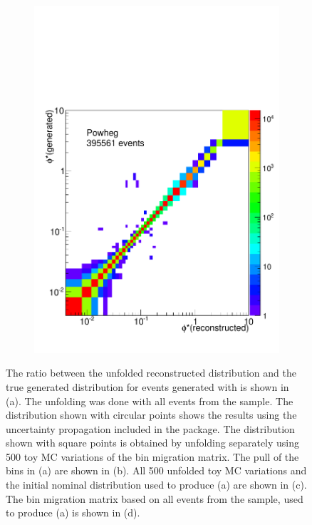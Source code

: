 \begin{figure}[!htbp]
\begin{subfigure}[b]{\SideBySidePlotWidth}
        \includegraphics[width=\textwidth]{figures/BinM_P_ALL.pdf}
        \caption{}
        \label{fig:bin_migration_all}
    \end{subfigure}
    \caption{
        The ratio between the unfolded reconstructed \phistar distribution and
        the true generated \phistar distribution for \Ztoee events generated
        with \MADGRAPH is shown in (a). The unfolding was done with all events
        from the \POWHEG sample. The distribution shown with circular points
        shows the results using the uncertainty propagation included in the
        \RooUnfold package. The distribution shown with square points is
        obtained by unfolding separately using 500 toy MC variations of the bin
        migration matrix. The pull of the bins in (a) are shown in (b). All
        \num{500} unfolded toy MC variations and the initial nominal
        distribution used to produce (a) are shown in (c). The bin migration
        matrix based on all events from the \POWHEG sample, used to produce (a)
        is shown in (d).
    }
\label{fig:full_propegation_unfolding}
\end{figure}

